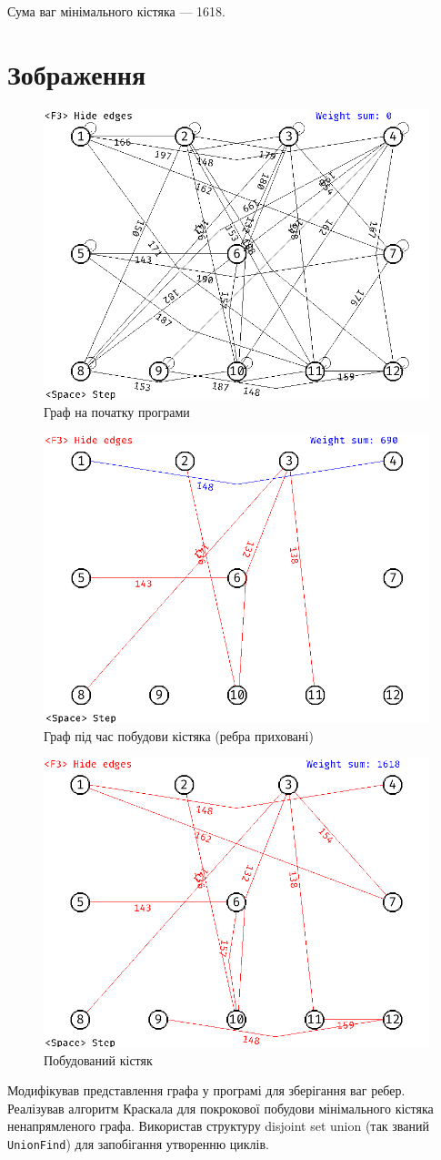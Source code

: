 Сума ваг мінімального кістяка --- 1618.

\section{Зображення}

\begin{figure}[ht!]
  \center\includegraphics[width=0.5\linewidth]{graph.png}
  \caption{Граф на початку програми}
\end{figure}
\begin{figure}[ht!]
  \center\includegraphics[width=0.5\linewidth]{in_progress.png}
  \caption{Граф під час побудови кістяка (ребра приховані)}
\end{figure}
\begin{figure}[ht!]
  \center\includegraphics[width=0.5\linewidth]{result.png}
  \caption{Побудований кістяк}
\end{figure}
\pagebreak

\conclusion%
Модифікував представлення графа у програмі для зберігання ваг ребер.\\
Реалізував алгоритм Краскала для покрокової побудови мінімального кістяка ненапрямленого графа.
Використав структуру disjoint set union (так званий\\
\texttt{UnionFind}) для запобігання утворенню циклів.



